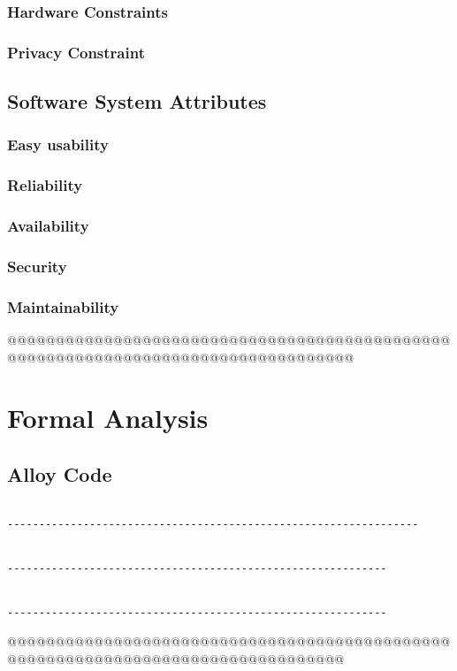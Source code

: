 \subsubsection{Hardware Constraints}

\subsubsection{Privacy Constraint}

\subsection{Software System Attributes}
\subsubsection{Easy usability}

\subsubsection{Reliability}

\subsubsection{Availability}

\subsubsection{Security}



\subsubsection{Maintainability}


\newpage
@@@@@@@@@@@@@@@@@@@@@@@@@@@@@@@@@@@@@@@@@@@@@@@@@@@@@@@@@@@@@@@@@@@@@@@@@@@@@@@@@@
\section{Formal Analysis}
\subsection{Alloy Code}
\begin{lstlisting}[language=alloy]

-----------------------------------------------------------------


------------------------------------------------------------


------------------------------------------------------------
\end{lstlisting}
\pagestyle{plain}
@@@@@@@@@@@@@@@@@@@@@@@@@@@@@@@@@@@@@@@@@@@@@@@@@@@@@@@@@@@@@@@@@@@@@@@@@@@@@@@@@
